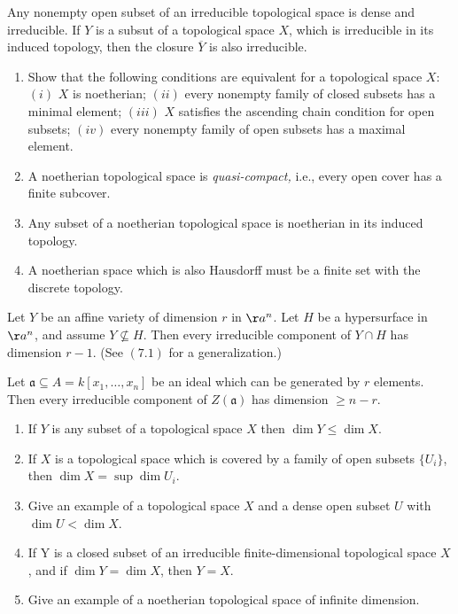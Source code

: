 \documentclass[openany, amssymb, psamsfonts]{amsart}
\begin{document}
\begin{exercise}[1.6]
Any nonempty open subset of an irreducible topological space is dense and irreducible. If $Y $ is a subsut of a topological space $X $, which is irreducible in its induced topology, then the closure $\overline{Y}  $ is also irreducible.
\end{exercise}

\begin{exercise}[1.7]
\begin{enumerate}
\item Show that the following conditions are equivalent for a topological space $X$: $(i)$ $X$ is noetherian; $(ii)$ every nonempty family of closed subsets has a minimal element; $(iii)$ $X$ satisfies the ascending chain condition for open subsets; $(iv)$ every nonempty family of open subsets has a maximal element.
\item A noetherian topological space is \emph{quasi-compact,} i.e., every open cover has a finite subcover.
\item Any subset of a noetherian topological space is noetherian in its induced topology.
\item A noetherian space which is also Hausdorff must be a finite set with the discrete topology.    
\end{enumerate}
\end{exercise}

\begin{exercise}[1.8]
Let $Y$ be an affine variety of dimension $r$ in $\aa^n$.
Let $H$ be a hypersurface in $\aa^n$, and assume $Y \not\subseteq H$.
Then every irreducible component of $Y \cap H$ has dimension $r-1$.
(See $(7.1)$ for a generalization.)
\end{exercise}

\begin{exercise}[1.9]
Let $\mathfrak{a} \subseteq A = k[x_1,\ldots,x_n]$ be an ideal which can be
generated by $r$ elements.
Then every irreducible component of $Z(\mathfrak{a})$ has dimension $\ge n-r$.
\end{exercise}

\begin{exercise}[1.10]
\begin{enumerate}
\item If $Y$ is any subset of a topological space $X$ then $\dim Y \leq \dim X$. 
\item If $X$ is a topological space which is covered by a family of open
	subsets $\{U_{i}\}$, then $\dim X = \sup \dim U_i$.
\item Give an example of a topological space $X$ and a dense open subset $U$
	with $\dim U < \dim X$. 
\item If Y is a closed subset of an irreducible finite-dimensional topological space $X$, and if $\dim Y = \dim X$, then $Y= X$. 
\item Give an example of a noetherian topological space of infinite dimension.  
\end{enumerate}
\end{exercise}
\end{document}
